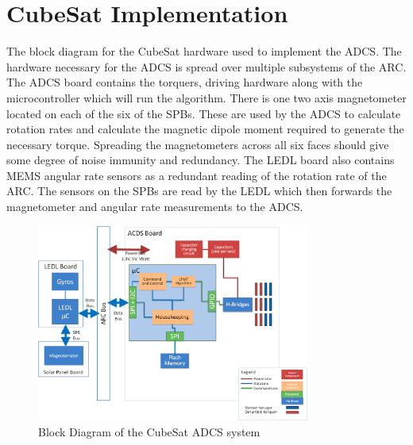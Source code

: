 
\chapter{CubeSat Implementation}

\label{ch:CubeSat}





The block diagram for the CubeSat hardware used to implement the \ac{ADCS}. The hardware necessary for the \ac{ADCS} is spread over multiple subsystems of the \ac{ARC}. The \ac{ADCS} board contains the torquers, driving hardware along with the microcontroller which will run the algorithm. There is one two axis magnetometer located on each of the six of the \acp{SPB}. These are used by the \ac{ADCS} to calculate rotation rates and calculate the magnetic dipole moment required to generate the necessary torque. Spreading the magnetometers across all six faces should give some degree of noise immunity and redundancy. The \ac{LEDL} board also contains \ac{MEMS} angular rate sensors as a redundant reading of the rotation rate of the \ac{ARC}. The sensors on the \acp{SPB} are read by the \ac{LEDL} which then forwards the magnetometer and angular rate measurements to the \ac{ADCS}.

\begin{figure}[H]
    \centering
    \includegraphics[width=0.8\textwidth]{Figures/Block}
    \caption{Block Diagram of the CubeSat \acs{ADCS} system}
\end{figure}

